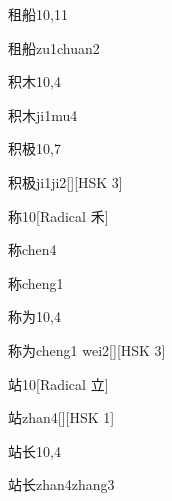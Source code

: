 \begin{entry}{租船}{10,11}
  \begin{phonetics}{租船}{zu1chuan2}
  \end{phonetics}
\end{entry}

\begin{entry}{积木}{10,4}
  \begin{phonetics}{积木}{ji1mu4}
  \end{phonetics}
\end{entry}

\begin{entry}{积极}{10,7}
  \begin{phonetics}{积极}{ji1ji2}[][HSK 3]
  \end{phonetics}
\end{entry}

\begin{entry}{称}{10}[Radical 禾]
  \begin{phonetics}{称}{chen4}
  \end{phonetics}
  \begin{phonetics}{称}{cheng1}
  \end{phonetics}
\end{entry}

\begin{entry}{称为}{10,4}
  \begin{phonetics}{称为}{cheng1 wei2}[][HSK 3]
  \end{phonetics}
\end{entry}

\begin{entry}{站}{10}[Radical 立]
  \begin{phonetics}{站}{zhan4}[][HSK 1]
  \end{phonetics}
\end{entry}

\begin{entry}{站长}{10,4}
  \begin{phonetics}{站长}{zhan4zhang3}
  \end{phonetics}
\end{entry}


